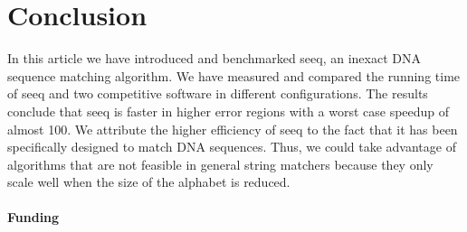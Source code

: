 \documentclass{bioinfo}
\begin{document}
\section{Conclusion}

In this article we have introduced and benchmarked seeq, an inexact
DNA sequence matching algorithm. We have measured and compared the
running time of seeq and two competitive software in different
configurations. The results conclude that seeq is faster in higher
error regions with a worst case speedup of almost 100. We attribute
the higher efficiency of seeq to the fact that it has been
specifically designed to match DNA sequences. Thus, we could take
advantage of algorithms that are not feasible in general string
matchers because they only scale well when the size of the alphabet is
reduced.

\paragraph{Funding\textcolon}



%
%
%
%
%
%
%

\end{document}
